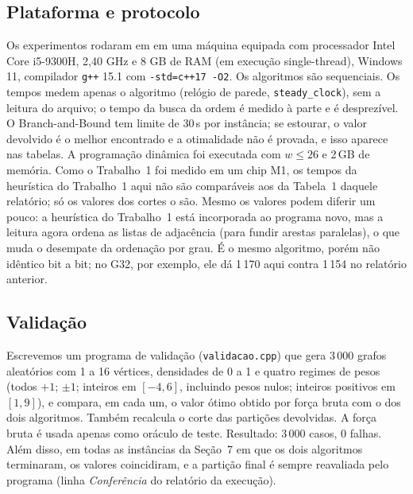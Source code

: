 \subsection{Plataforma e protocolo}

Os experimentos rodaram em em uma máquina equipada com processador Intel Core i5-9300H, 2,40 GHz e 8 GB de RAM (em execução single-thread), Windows 11, compilador \texttt{g++} 15.1 com \texttt{-std=c++17 -O2}. Os algoritmos são sequenciais. Os tempos medem apenas o algoritmo (relógio de parede, \texttt{steady\_clock}), sem a leitura do arquivo; o tempo da busca da ordem é medido à parte e é desprezível. O Branch-and-Bound tem limite de 30\,s por instância; se estourar, o valor devolvido é o melhor encontrado e a otimalidade não é provada, e isso aparece nas tabelas. A programação dinâmica foi executada com $w\le26$ e 2\,GB de memória. Como o Trabalho~1 foi medido em um chip M1, os tempos da heurística do Trabalho~1 aqui não são comparáveis aos da Tabela~1 daquele relatório; só os valores dos cortes o são. Mesmo os valores podem diferir um pouco: a heurística do Trabalho~1 está incorporada ao programa novo, mas a leitura agora ordena as listas de adjacência (para fundir arestas paralelas), o que muda o desempate da ordenação por grau. É o mesmo algoritmo, porém não idêntico bit a bit; no G32, por exemplo, ele dá 1\,170 aqui contra 1\,154 no relatório anterior.

\subsection{Validação}

Escrevemos um programa de validação (\texttt{validacao.cpp}) que gera 3\,000 grafos aleatórios com 1 a 16 vértices, densidades de 0 a 1 e quatro regimes de pesos (todos $+1$; $\pm1$; inteiros em $[-4,6]$, incluindo pesos nulos; inteiros positivos em $[1,9]$), e compara, em cada um, o valor ótimo obtido por força bruta com o dos dois algoritmos. Também recalcula o corte das partições devolvidas. A força bruta é usada apenas como oráculo de teste. Resultado: 3\,000 casos, 0 falhas. Além disso, em todas as instâncias da Seção~7 em que os dois algoritmos terminaram, os valores coincidiram, e a partição final é sempre reavaliada pelo programa (linha \emph{Conferência} do relatório da execução).

